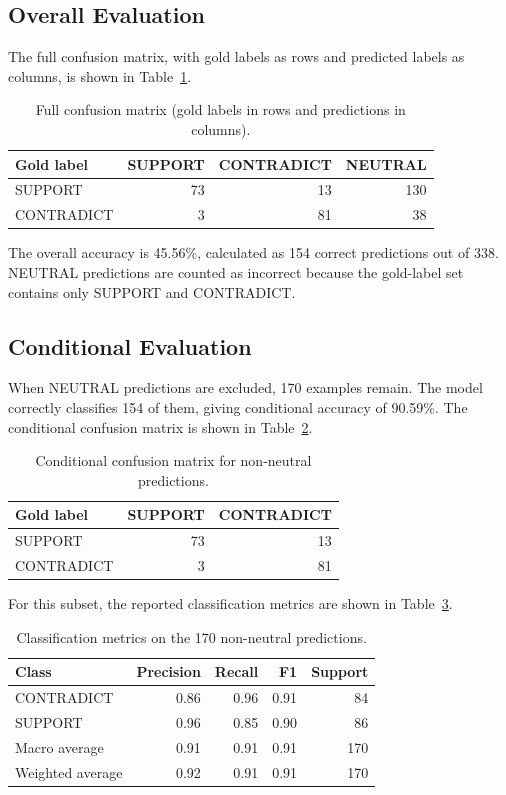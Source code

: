 \documentclass[conference]{IEEEtran}
\begin{document}
\subsection{Overall Evaluation}
The full confusion matrix, with gold labels as rows and predicted labels as columns, is shown in Table~\ref{tab:full-confusion}.

\begin{table}[t]
\centering
\caption{Full confusion matrix (gold labels in rows and predictions in columns).}
\label{tab:full-confusion}
\begin{tabular}{lrrr}
\toprule
\textbf{Gold label} & \textbf{SUPPORT} & \textbf{CONTRADICT} & \textbf{NEUTRAL}\\
\midrule
SUPPORT & 73 & 13 & 130\\
CONTRADICT & 3 & 81 & 38\\
\bottomrule
\end{tabular}
\end{table}

The overall accuracy is 45.56\%, calculated as 154 correct predictions out of 338. NEUTRAL predictions are counted as incorrect because the gold-label set contains only SUPPORT and CONTRADICT.

\subsection{Conditional Evaluation}
When NEUTRAL predictions are excluded, 170 examples remain. The model correctly classifies 154 of them, giving conditional accuracy of 90.59\%. The conditional confusion matrix is shown in Table~\ref{tab:conditional-confusion}.

\begin{table}[t]
\centering
\caption{Conditional confusion matrix for non-neutral predictions.}
\label{tab:conditional-confusion}
\begin{tabular}{lrr}
\toprule
\textbf{Gold label} & \textbf{SUPPORT} & \textbf{CONTRADICT}\\
\midrule
SUPPORT & 73 & 13\\
CONTRADICT & 3 & 81\\
\bottomrule
\end{tabular}
\end{table}

For this subset, the reported classification metrics are shown in Table~\ref{tab:conditional-metrics}.

\begin{table}[t]
\centering
\caption{Classification metrics on the 170 non-neutral predictions.}
\label{tab:conditional-metrics}
\begin{tabular}{lrrrr}
\toprule
\textbf{Class} & \textbf{Precision} & \textbf{Recall} & \textbf{F1} & \textbf{Support}\\
\midrule
CONTRADICT & 0.86 & 0.96 & 0.91 & 84\\
SUPPORT & 0.96 & 0.85 & 0.90 & 86\\
Macro average & 0.91 & 0.91 & 0.91 & 170\\
Weighted average & 0.92 & 0.91 & 0.91 & 170\\
\bottomrule
\end{tabular}
\end{table}
\end{document}
